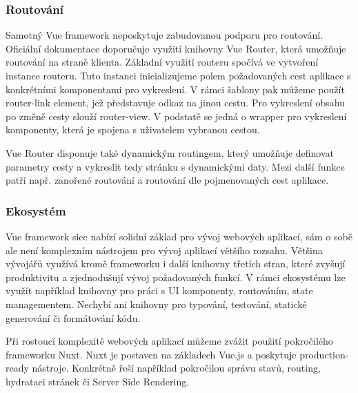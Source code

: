 \subsubsection{Routování}

Samotný Vue framework neposkytuje zabudovanou podporu pro routování. Oficiální dokumentace doporučuje využití knihovny Vue Router, která umožňuje routování na straně klienta. 
Základní využití routeru spočívá ve vytvoření instance routeru. Tuto instanci inicializujeme polem požadovaných cest aplikace s konkrétními komponentami pro vykreslení. 
V rámci šablony pak můžeme použít router-link element, jež představuje odkaz na jinou cestu. Pro vykreslení obsahu po změně cesty slouží router-view. 
V podstatě se jedná o wrapper pro vykreslení komponenty, která je spojena s uživatelem vybranou cestou.

Vue Router disponuje také dynamickým routingem, který umožňuje definovat parametry cesty a vykreslit tedy stránku s dynamickými daty. 
Mezi další funkce patří např. zanořené routování a routování dle pojmenovaných cest aplikace.\cite{vue,vuerouter}

\subsubsection{Ekosystém}

Vue framework sice nabízí solidní základ pro vývoj webových aplikací, sám o sobě ale není komplexním nástrojem pro vývoj aplikací většího rozsahu. 
Většina vývojářů využívá kromě frameworku i další knihovny třetích stran, které zvyšují produktivitu a zjednodušují vývoj požadovaných funkcí. 
V rámci ekosystému lze využít například knihovny pro práci s UI komponenty, routováním, state managementem. 
Nechybí ani knihovny pro typování, testování, statické generování či formátování kódu.

Při rostoucí komplexitě webových aplikací můžeme zvážit použití pokročilého frameworku Nuxt. Nuxt je postaven na základech Vue.js a poskytuje production-ready nástroje. 
Konkrétně řeší například pokročilou správu stavů, routing, hydrataci stránek či Server Side Rendering.\cite{awesomevue,vue}